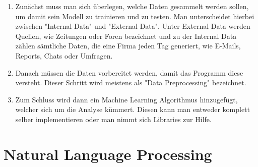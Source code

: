 \begin{enumerate}
    \item Zunächst muss man sich überlegen, welche Daten gesammelt werden sollen, um damit sein Modell zu trainieren und zu testen.
    Man unterscheidet hierbei zwischen "Internal Data" und "External Data".
    Unter External Data werden Quellen, wie Zeitungen oder Foren bezeichnet und zu der Internal Data zählen sämtliche Daten, die eine Firma jeden Tag generiert, wie E-Mails, Reports, Chats oder Umfragen.
    \item Danach müssen die Daten vorbereitet werden, damit das Programm diese versteht.
    Dieser Schritt wird meistens als "Data Preprocessing" bezeichnet.
    \item Zum Schluss wird dann ein Machine Learning Algorithmus hinzugefügt, welcher sich um die Analyse kümmert.
    Diesen kann man entweder komplett selber implementieren oder man nimmt sich Libraries zur Hilfe.\cite{machineLearningTextAnalysis}
\end{enumerate}

\section{Natural Language Processing}
